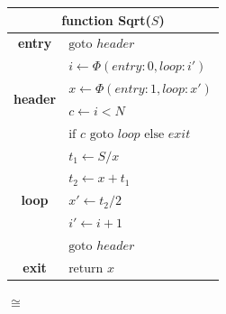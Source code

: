\begin{figure}[p]
\centering
\begin{minipage}{0.42\textwidth}
\begin{tabular}{|cl|}
\multicolumn{2}{c}{{\bf function} Sqrt($S$)}\\
\hline
{\bf entry} & $\text{goto } header$\\
\hline
\multirow{4}{*}{\bf header} & $i \leftarrow \Phi(entry:0,loop:i')$\\[-2pt]
                            & $x \leftarrow \Phi(entry:1,loop:x')$\\[-2pt]
                            & $c \leftarrow i<N$\\[-2pt]
                            & $\text{if }c\text{ goto }loop\text{ else }exit$\\
\hline
\multirow{5}{*}{\bf loop} & $t_1\leftarrow S/x$\\[-2pt]
                          & $t_2\leftarrow x+t_1$\\[-2pt]
                          & $x'\leftarrow t_2/2$\\[-2pt]
                          & $i'\leftarrow i+1$\\[-2pt]
                          & $\text{goto }header$\\
\hline
{\bf exit} & $\text{return }x$\\
\hline
\end{tabular}
\end{minipage}

\vspace{9.58919pt}
{\huge
$\cong$}
\vspace{9.58919pt}


\end{figure}
